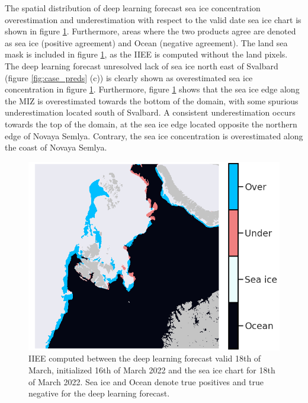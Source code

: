 \documentclass[../main/thesis.tex]{subfiles}
\begin{document}
The spatial distribution of deep learning forecast sea ice concentration overestimation and underestimation \citep{Goessling2016} with respect to the valid date sea ice chart is shown in figure \ref{fig:case_iiee}. Furthermore, areas where the two products agree are denoted as sea ice (positive agreement) and Ocean (negative agreement). The land sea mask is included in figure \ref{fig:case_iiee}, as the IIEE is computed without the land pixels. The deep learning forecast unresolved lack of sea ice north east of Svalbard (figure \ref{fig:case_preds} (c)) is clearly shown as overestimated sea ice concentration in figure \ref{fig:case_iiee}. Furthermore, figure \ref{fig:case_iiee} shows that the sea ice edge along the MIZ is overestimated towards the bottom of the domain, with some spurious underestimation located south of Svalbard. A consistent underestimation occurs towards the top of the domain, at the sea ice edge located opposite the northern edge of Novaya Semlya. Contrary, the sea ice concentration is overestimated along the coast of Novaya Semlya.

\begin{figure}
    \centering
    \includegraphics[width=\textwidth]{iiee}
    \caption{\label{fig:case_iiee}IIEE computed between the deep learning forecast valid 18th of March, initialized 16th of March 2022 and the sea ice chart for 18th of March 2022. Sea ice and Ocean denote true positives and true negative for the deep learning forecast.}
\end{figure}




\biblio
\end{document}
